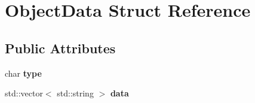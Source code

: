 \hypertarget{structObjectData}{
\section{ObjectData Struct Reference}
\label{structObjectData}
}
\subsection*{Public Attributes}
\begin{DoxyCompactItemize}
\item 
\hypertarget{structObjectData_a77f1a74deb864606b1b5cc115c2a99a5}{
char {\bfseries type}}
\label{structObjectData_a77f1a74deb864606b1b5cc115c2a99a5}

\item 
\hypertarget{structObjectData_af755ea276bafd67e377e869950c1eb48}{
std::vector$<$ std::string $>$ {\bfseries data}}
\label{structObjectData_af755ea276bafd67e377e869950c1eb48}

\end{DoxyCompactItemize}
